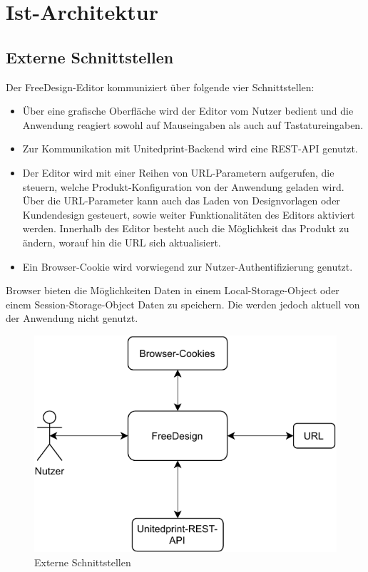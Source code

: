 \section{Ist-Architektur}

\subsection{Externe Schnittstellen}
Der FreeDesign-Editor kommuniziert über folgende vier Schnittstellen:
\begin{itemize}
	\item Über eine grafische Oberfläche wird der Editor vom Nutzer bedient und die Anwendung reagiert sowohl auf Mauseingaben als auch auf Tastatureingaben. 
	\item Zur Kommunikation mit Unitedprint-Backend wird eine REST-API genutzt. 
	\item Der Editor wird mit einer Reihen von URL-Parametern aufgerufen, die steuern, welche Produkt-Konfiguration von der Anwendung geladen wird. Über die URL-Parameter kann auch das Laden von Designvorlagen oder Kundendesign gesteuert, sowie weiter Funktionalitäten des Editors aktiviert werden. 
	Innerhalb des Editor besteht auch die Möglichkeit das Produkt zu ändern, worauf hin die URL sich aktualisiert.
	\item Ein Browser-Cookie wird vorwiegend zur Nutzer-Authentifizierung genutzt. 
\end{itemize}

Browser bieten die Möglichkeiten Daten in einem Local-Storage-Object oder einem Session-Storage-Object Daten zu speichern. \autocite[vgl.][]{Mozilla:Storage}
Die werden jedoch aktuell von der Anwendung nicht genutzt. 

\begin{figure}[ht]
  \centering
  \includegraphics{diagrams/Freedesign_Interaktion.pdf}
   \caption{Externe Schnittstellen}
   \label{fig:Externe_Schnittstellen}
\end{figure}

